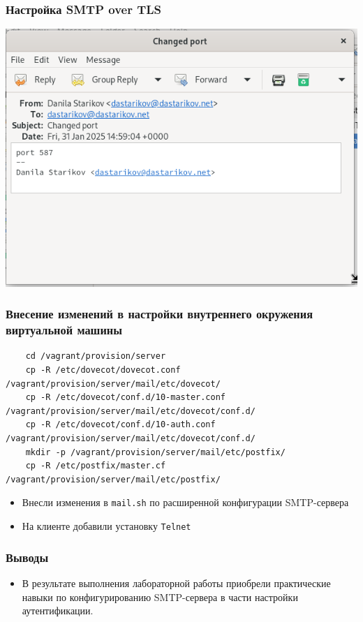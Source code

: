 \begin{frame}
  \frametitle{Настройка SMTP over TLS} 
    \centering
    \includegraphics[width=\textwidth]{../images/image22.png}
\end{frame}

\begin{frame}[fragile]
  \frametitle{Внесение изменений в настройки внутреннего окружения виртуальной машины}
    \begin{verbatim}
    cd /vagrant/provision/server
    cp -R /etc/dovecot/dovecot.conf /vagrant/provision/server/mail/etc/dovecot/
    cp -R /etc/dovecot/conf.d/10-master.conf /vagrant/provision/server/mail/etc/dovecot/conf.d/
    cp -R /etc/dovecot/conf.d/10-auth.conf /vagrant/provision/server/mail/etc/dovecot/conf.d/
    mkdir -p /vagrant/provision/server/mail/etc/postfix/
    cp -R /etc/postfix/master.cf /vagrant/provision/server/mail/etc/postfix/
  \end{verbatim}
  \begin{itemize}
  \item Внесли изменения в \texttt{mail.sh} по расширенной конфигурации SMTP-сервера
  \item На клиенте добавили установку \texttt{Telnet}
  \end{itemize}
\end{frame}

\begin{frame}
\frametitle{Выводы}
\begin{itemize}
    \item В результате выполнения лабораторной работы приобрели практические навыки по конфигурированию SMTP-сервера в части настройки аутентификации.
\end{itemize}
\end{frame}

